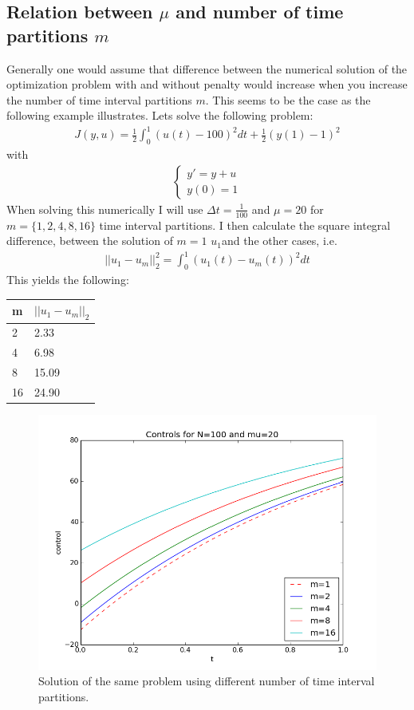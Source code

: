 \documentclass[11pt,a4paper]{article}
\begin{document}
\subsection{Relation between $\mu$ and number of time partitions $m$}
Generally one would assume that difference between the numerical solution of the optimization problem with and without penalty would increase when you increase the number of time interval partitions $m$. This seems to be the case as the following example illustrates. Lets solve the following problem:
\begin{align*}
J(y,u) =\frac{1}{2} \int_0^1 (u(t)-100)^2dt + \frac{1}{2}(y(1)-1)^2
\end{align*}  
with 
\begin{align*}
\left\{
     \begin{array}{lr}
       	y' =  y +u\\
       	   y(0)=1
     \end{array}
   \right.
\end{align*}
When solving this numerically I will use $\Delta t= \frac{1}{100}$ and $\mu=20$ for $m=\{1,2,4,8,16\}$ time interval partitions. I then calculate the square integral difference, between the solution of $m=1$ $u_1$and the other cases, i.e.
\begin{align*}
||u_1-u_m||_2^2 = \int_0^1 (u_1(t)-u_m(t))^2dt
\end{align*} 
This yields the following:
\begin{center}
    \begin{tabular}{| l | l |}
    \hline
    m & $ ||u_1-u_m||_2$ \\ \hline
    2 & 2.33\\ \hline
    4 & 6.98\\ \hline
    8 & 15.09\\ \hline
    16 & 24.90 \\ \hline
    \end{tabular}
\end{center}
\begin{figure}
  \includegraphics[width=\linewidth]{m_plots.png}
  \caption{Solution of the same problem using different number of time interval partitions.}
  \label{Fig 6}
\end{figure}
\end{document}
